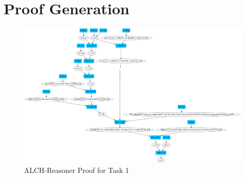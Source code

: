 \documentclass[titlepage]{article}
\begin{document}
\section{Proof Generation}
\begin{figure}
  \centering
  \includegraphics[width=1\textwidth]{pictures/ALCH_task00001.png}
  \caption{ALCH-Reasoner Proof for Task 1}
  \label{fig:label}
\end{figure}
\end{document}
